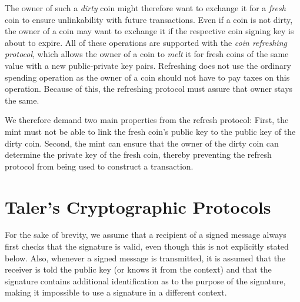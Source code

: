 \documentclass{llncs}
\begin{document}
The owner of such a {\em dirty} coin might therefore want to exchange it
for a {\em fresh} coin to ensure unlinkability with future transactions.
Even if a coin is not dirty, the owner of a coin may want to exchange it
if the respective coin signing key is about to expire.  All of these
operations are supported with the {\em coin refreshing protocol}, which
allows the owner of a coin to {\em melt} it for fresh coins of the same
value with a new public-private key pairs.  Refreshing does not use the
ordinary spending operation as the owner of a coin should not have to
pay taxes on this operation.  Because of this, the refreshing protocol
must assure that owner stays the same. 

We therefore demand two main properties from the refresh protocol:
First, the mint must not be able to link the fresh coin's public key to
the public key of the dirty coin.  Second, the mint can ensure that the
owner of the dirty coin can determine the private key of the
fresh coin, thereby preventing the refresh protocol from being used to
construct a transaction.

%


\section{Taler's Cryptographic Protocols}


For the sake of brevity, we assume that a recipient of a signed
message always first checks that the signature is valid, even though
this is not explicitly stated below.  Also, whenever a signed message
is transmitted, it is assumed that the receiver is told the public key
(or knows it from the context) and that the signature contains
additional identification as to the purpose of the signature, making
it impossible to use a signature in a different context.
\end{document}
